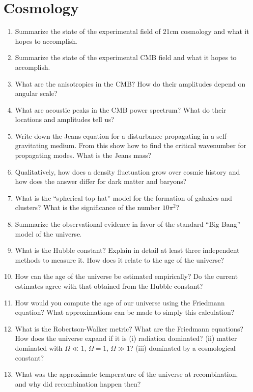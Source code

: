 \documentclass[11pt, oneside]{book}
\begin{document}
\section{Cosmology}

\begin{enumerate}[start=126, itemsep=0.4cm]
    \item Summarize the state of the experimental field of 21cm cosmology and what it hopes to accomplish.
    \item Summarize the state of the experimental CMB field and what it hopes to accomplish.
    \item What are the anisotropies in the CMB? How do their amplitudes depend on angular scale?
    \item What are acoustic peaks in the CMB power spectrum? What do their locations and amplitudes tell us?
    \item Write down the Jeans equation for a disturbance propagating in a self-gravitating medium. From this show how to find the critical wavenumber for propagating modes. What is the Jeans mass?
    \item Qualitatively, how does a density fluctuation grow over cosmic history and how does the answer differ for dark matter and baryons?
    \item What is the ``spherical top hat'' model for the formation of galaxies and clusters? What is the significance of the number $10 \pi^{2}$?
    \item Summarize the observational evidence in favor of the standard ``Big Bang'' model of the universe.
    \item What is the Hubble constant? Explain in detail at least three independent methods to measure it. How does it relate to the age of the universe?
    \item How can the age of the universe be estimated empirically? Do the current estimates agree with that obtained from the Hubble constant?
    \item How would you compute the age of our universe using the Friedmann equation? What approximations can be made to simply this calculation?
    \item What is the Robertson-Walker metric? What are the Friedmann equations? How does the universe expand if it is (i) radiation dominated? (ii) matter dominated with $\Omega \ll 1$, $\Omega = 1$, $\Omega \gg 1$? (iii) dominated by a cosmological constant?
    \item What was the approximate temperature of the universe at recombination, and why did recombination happen then?

\end{enumerate}
\end{document}
